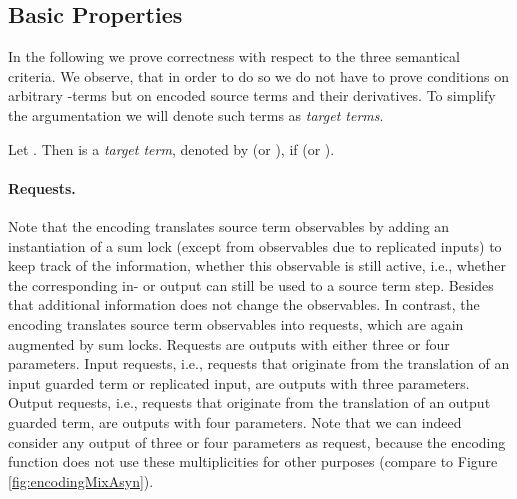 \documentclass[]{llncs}
\begin{document}
\subsection{Basic Properties}

In the following we prove correctness with respect to the three semantical criteria. We observe, that in order to do so we do not have to prove conditions on arbitrary \piAsyn-terms but on encoded source terms and their derivatives. To simplify the argumentation we will denote such terms as \emph{target terms}.

\begin{definition} \label{def:targetTerm}
	Let . Then  is a \emph{target term}, denoted by  (or ), if  (or ).
\end{definition}

\paragraph*{Requests.} Note that the encoding  translates source term observables by adding an instantiation of a sum lock (except from observables due to replicated inputs) to keep track of the information, whether this observable is still active, i.e., whether the corresponding in- or output can still be used to \simulate a source term step. Besides that additional information  does not change the observables. In contrast, the encoding  translates source term observables into requests, which are again augmented by sum locks. Requests are outputs with either three or four parameters. Input requests, i.e., requests that originate from the translation of an input guarded term or replicated input, are outputs with three parameters. Output requests, i.e., requests that originate from the translation of an output guarded term, are outputs with four parameters. Note that we can indeed consider any output of three or four parameters as request, because the encoding function does not use these multiplicities for other purposes (compare to Figure \ref{fig:encodingMixAsyn}).
\end{document}
